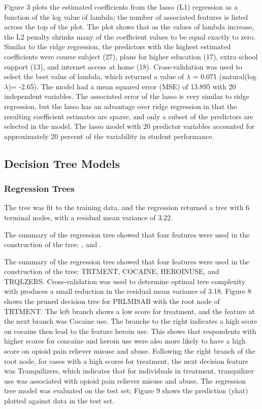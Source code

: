 \documentclass[sigconf]{acmart}
\begin{document}
Figure 3 plots the estimated coefficients from the lasso (L1) regression as 
a function of the log value of lambda; the number of associated features is 
listed across the top of the plot. The plot shows that as the values of lambda 
increase, the L2 penalty shrinks many of the coefficient values to be equal 
exactly to zero. Similar to the ridge regression, the predictors with the 
highest estimated coefficients were course subject (27), plans for higher
education (17), extra school support (13), and internet access at home (18). 
Cross-validation was used to select the best value of lambda, which returned a 
value of $\lambda$ = 0.071 (natural(log$\lambda$)= -2.65). The model had a 
mean squared error (MSE) of 13.895 with 20 independent variables. The associated 
error of the lasso is very similar to ridge regression, but the lasso has an 
advantage over ridge regression in that the resulting coefficient estimates 
are sparse, and only a subset of the predictors are selected in the model. 
The lasso model with 20 predictor variables accounted for approximately 20 
percent of the variability in student performance. 


\subsection{Decision Tree Models}

\subsubsection{Regression Trees}

The tree was fit to the training data, and the regression returned a tree with 
6 terminal nodes, with a residual mean variance of 3.22. 

The summary of the regression tree showed that four features were used in the 
construction of the tree: , and . 

The summary of the 
regression tree showed that four features were used in the construction of 
the tree: TRTMENT, COCAINE, HEROINUSE, and TRQLZERS. Cross-validation 
was used to determine optimal tree complexity with produces a small reduction
in the residual mean variance of 3.18. Figure 8 shows the pruned decision tree 
for PRLMISAB with the root node of TRTMENT. The left branch shows a low 
score for treatment, and the feature at the next branch was Cocaine use. 
The branche to the right indicates a high score on cocaine then lead to 
the feature heroin use. This shows that respondents with higher scores for 
concaine and heroin use were also more likely to have a high score on 
opioid pain reliever misuse and abuse. Following the right branch of the 
root node, for cases with a high scores for treatment, the next decision 
feature was Tranquilizers, which indicates that for individuals in treatment, 
tranquilizer use was associated with opioid pain reliever misuse and abuse. 
The regression tree model was evaluated on the test set; Figure 9 shows 
the prediction (yhat) plotted against data in the test set.
\end{document}
